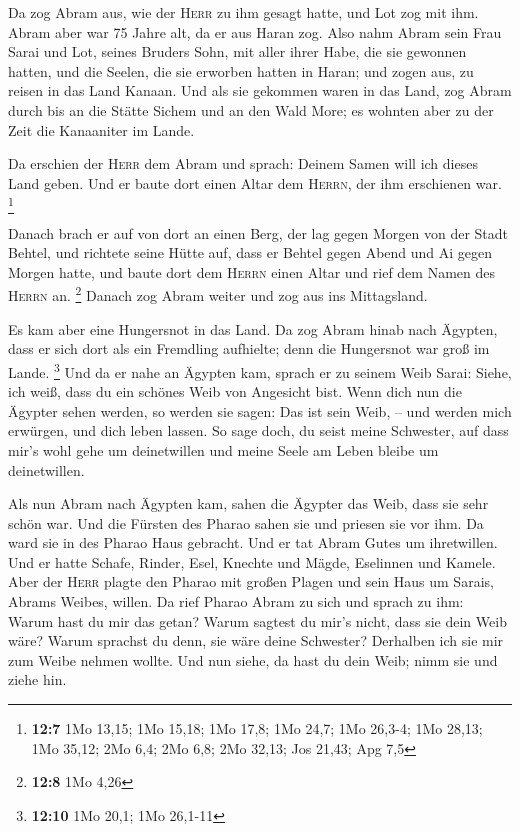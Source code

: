  Da zog Abram aus, wie der \textsc{Herr} zu ihm gesagt
hatte, und Lot zog mit ihm. Abram aber war 75 Jahre alt, da er aus Haran
zog.  Also nahm Abram sein Frau Sarai und Lot, seines
Bruders Sohn, mit aller ihrer Habe, die sie gewonnen hatten, und die
Seelen, die sie erworben hatten in Haran; und zogen aus, zu reisen in
das Land Kanaan. Und als sie gekommen waren in das Land, 
zog Abram durch bis an die Stätte Sichem und an den Wald More; es
wohnten aber zu der Zeit die Kanaaniter im Lande.

 Da erschien der \textsc{Herr} dem Abram und sprach:
Deinem Samen will ich dieses Land geben. Und er baute dort einen Altar
dem \textsc{Herrn}, der ihm erschienen war. \footnote{\textbf{12:7} 1Mo
  13,15; 1Mo 15,18; 1Mo 17,8; 1Mo 24,7; 1Mo 26,3-4; 1Mo 28,13; 1Mo
  35,12; 2Mo 6,4; 2Mo 6,8; 2Mo 32,13; Jos 21,43; Apg 7,5}

 Danach brach er auf von dort an einen Berg, der lag gegen
Morgen von der Stadt Behtel, und richtete seine Hütte auf, dass er
Behtel gegen Abend und Ai gegen Morgen hatte, und baute dort dem
\textsc{Herrn} einen Altar und rief dem Namen des \textsc{Herrn} an.
\footnote{\textbf{12:8} 1Mo 4,26}  Danach zog Abram weiter
und zog aus ins Mittagsland.

 Es kam aber eine Hungersnot in das Land. Da zog Abram
hinab nach Ägypten, dass er sich dort als ein Fremdling aufhielte; denn
die Hungersnot war groß im Lande. \footnote{\textbf{12:10} 1Mo 20,1; 1Mo
  26,1-11}  Und da er nahe an Ägypten kam, sprach er zu
seinem Weib Sarai: Siehe, ich weiß, dass du ein schönes Weib von
Angesicht bist.  Wenn dich nun die Ägypter sehen werden,
so werden sie sagen: Das ist sein Weib, -- und werden mich erwürgen, und
dich leben lassen.  So sage doch, du seist meine
Schwester, auf dass mir's wohl gehe um deinetwillen und meine Seele am
Leben bleibe um deinetwillen.

 Als nun Abram nach Ägypten kam, sahen die Ägypter das
Weib, dass sie sehr schön war.  Und die Fürsten des
Pharao sahen sie und priesen sie vor ihm. Da ward sie in des Pharao Haus
gebracht.  Und er tat Abram Gutes um ihretwillen. Und er
hatte Schafe, Rinder, Esel, Knechte und Mägde, Eselinnen und Kamele.
 Aber der \textsc{Herr} plagte den Pharao mit großen
Plagen und sein Haus um Sarais, Abrams Weibes, willen. 
Da rief Pharao Abram zu sich und sprach zu ihm: Warum hast du mir das
getan? Warum sagtest du mir's nicht, dass sie dein Weib wäre?
 Warum sprachst du denn, sie wäre deine Schwester?
Derhalben ich sie mir zum Weibe nehmen wollte. Und nun siehe, da hast du
dein Weib; nimm sie und ziehe hin.

